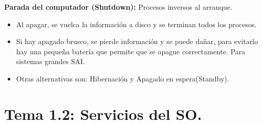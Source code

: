 \documentclass[12pt, twoside, openright]{report} %
\begin{document}
  \textbf{Parada del computador (Shutdown):} Procesos inversos al
  arranque.
  

  \begin{itemize}
  \item Al apagar, se vuelca la información a disco y se terminan todos los
    procesos.
    
  \item Si hay apagado brusco, se pierde información y se puede dañar, para
    evitarlo hay una pequeña batería que permite que se apague
    correctamente. Para sistemas grandes SAI.
    
  \item Otras alternativas son: Hibernación y Apagado en espera(Standby).
    
  \end{itemize}

\section{Tema 1.2: Servicios del SO.}
\end{document}

